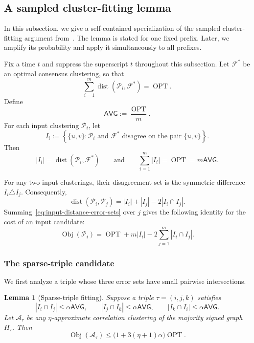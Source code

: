 \documentclass[11pt]{article}
\newtheorem{lemma}[theorem]{Lemma}
\theoremstyle{definition}
\theoremstyle{remark}
\newcommand{\A}{\mathcal A}
\newcommand{\F}{\mathcal F}
\newcommand{\Pp}{\mathcal P}
\newcommand{\OPT}{\operatorname{OPT}}
\newcommand{\Obj}{\operatorname{Obj}}
\newcommand{\dist}{\operatorname{dist}}
\newcommand{\1}{\mathbf 1}
\begin{document}
\subsection{A sampled cluster-fitting lemma}

In this subsection, we give a self-contained specialization of the sampled
cluster-fitting argument from~\cite{ChakrabortyEtAl2026}.  The lemma is
stated for one fixed prefix.  Later, we amplify its probability and apply it
simultaneously to all prefixes.

Fix a time $t$ and suppress the superscript $t$ throughout this subsection.
Let $\F^*$ be an optimal consensus clustering, so that
\[
  \sum_{i=1}^m\dist(\Pp_i,\F^*)=\OPT.
\]
Define
\begin{equation}\label{eq:avg-definition}
  \mathsf{AVG}:=\frac{\OPT}{m}.
\end{equation}
For each input clustering $\Pp_i$, let
\begin{equation}\label{eq:error-set}
  I_i
  :=
  \left\{
    \{u,v\}:\Pp_i\text{ and }\F^*
    \text{ disagree on the pair }\{u,v\}
  \right\}.
\end{equation}
Then
\begin{equation}\label{eq:error-size}
  |I_i|=\dist(\Pp_i,\F^*)
  \qquad\text{and}\qquad
  \sum_{i=1}^m|I_i|=\OPT=m\mathsf{AVG}.
\end{equation}

For any two input clusterings, their disagreement set is the symmetric
difference $I_i\triangle I_j$.  Consequently,
\begin{equation}\label{eq:input-distance-error-sets}
 \dist(\Pp_i,\Pp_j)
 =|I_i|+|I_j|-2|I_i\cap I_j|.
\end{equation}
Summing~\eqref{eq:input-distance-error-sets} over $j$ gives the following
identity for the cost of an input candidate:
\begin{equation}\label{eq:input-candidate-cost-identity}
 \Obj(\Pp_i)
 =\OPT+m|I_i|-2\sum_{j=1}^m|I_i\cap I_j|.
\end{equation}

\subsubsection{The sparse-triple candidate}

We first analyze a triple whose three error sets have small pairwise
intersections.

\begin{lemma}[Sparse-triple fitting]\label{lem:sparse-triple}
Suppose a triple $\tau=(i,j,k)$ satisfies
\begin{equation}\label{eq:sparse-triple-condition}
 |I_i\cap I_j|\le\alpha\mathsf{AVG},\qquad
 |I_j\cap I_k|\le\alpha\mathsf{AVG},\qquad
 |I_k\cap I_i|\le\alpha\mathsf{AVG}.
\end{equation}
Let $\A_\tau$ be any $\eta$-approximate correlation clustering of the
majority signed graph $H_\tau$.  Then
\begin{equation}\label{eq:sparse-triple-cost}
 \Obj(\A_\tau)
 \le
 \bigl(1+3(\eta+1)\alpha\bigr)\OPT.
\end{equation}
\end{lemma}
\end{document}
